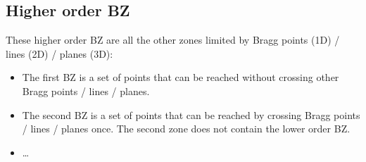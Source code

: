 \subsection{Higher order BZ}
These higher order BZ are all the other zones limited by Bragg points (1D) / lines (2D) / planes (3D):
\begin{itemize}
	\item The first BZ is a set of points that can be reached without crossing other Bragg points / lines / planes.
	\item The second BZ is a set of points that can be reached by crossing Bragg points / lines / planes once. The second zone does not contain the lower order BZ.
	\item \dots
\end{itemize}
